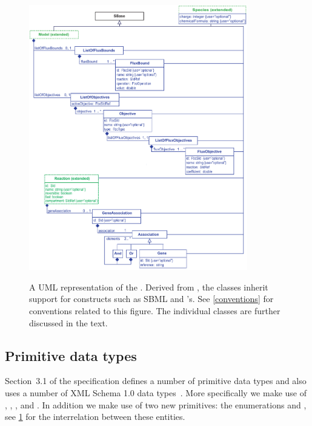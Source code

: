 \begin{figure}[h!]
  \centering
  \includegraphics[width=0.85\textwidth]{images/fbc_uml_v2.pdf}\\
  \caption{A UML representation of the \FBCPackage. Derived from \SBase, the \FBC classes inherit support for constructs such as SBML \Notes and \Annotation's. See \ref{conventions} for conventions related to this figure. The individual classes are further discussed in the text.}
  \label{fig:fbc_uml}
\end{figure}

\subsection{Primitive data types}
\label{primtypes}

Section~3.1 of the \sbmlthreecore specification defines a number of primitive
data types and also uses a number of XML Schema 1.0 data types~\citep{biron:2000}.
More specifically we make use of , ,
,  and . In addition we make use of
two new primitives: the enumerations  and ,
see \ref{fig:fbc_uml} for the interrelation between these entities.

